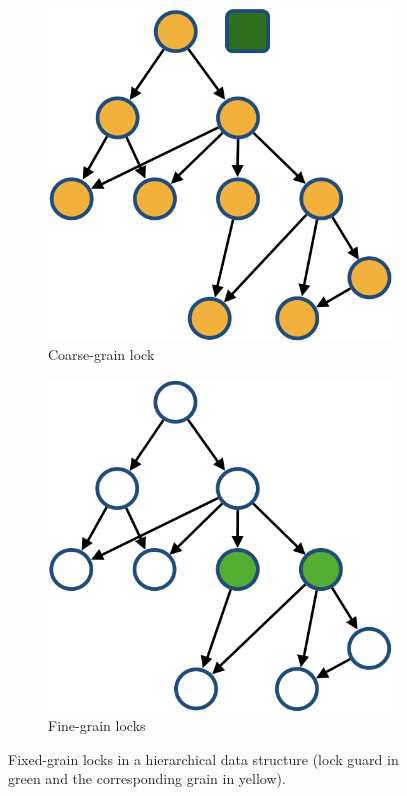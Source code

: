 \begin{figure}[H]
    \captionsetup{justification=centering}
    \centering
    \begin{subfigure}{.49\textwidth}
        \centering
        \includegraphics[width=.7\columnwidth]{figures/CoarseGrainedLockingTree}
        \caption{Coarse-grain lock}        
        \label{fig:fixedLockGrainsCoarse}
    \end{subfigure}
    \begin{subfigure}{.49\textwidth}
        \centering
        \includegraphics[width=.7\columnwidth]{figures/FineGrainLockingTree}
        \caption{Fine-grain locks}
        \label{fig:fixedLockGrainsFine}
    \end{subfigure}
    
    \label{fig:fixedLockGrains}
\caption{Fixed-grain locks in a hierarchical data structure (lock guard in green and the corresponding grain in yellow).}
\end{figure}


